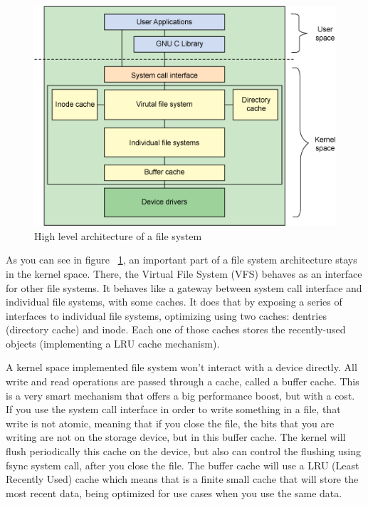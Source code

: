         \begin{figure}[h]
           \begin{center}
               \includegraphics[width=\textwidth]{theoretical/filesystem-arhitecture.png}
            \end{center}
            \caption{High level architecture of a file system \cite{FSA}}
            \label{fig:filesystem}
        \end{figure}

        As you can see in figure ~\ref{fig:filesystem}, an important part of a file system architecture stays in the kernel space. There, the Virtual File System (VFS) behaves as an interface for other file systems. It behaves like a gateway between system call interface and individual file systems, with some caches. It does that by exposing a series of interfaces to individual file systems, optimizing using two caches: dentries (directory cache) and inode. Each one of those caches stores the recently-used objects (implementing a LRU cache mechanism).

        A kernel space implemented file system won't interact with a device directly. All write and read operations are passed through a cache, called a buffer cache. This is a very smart mechanism that offers a big performance boost, but with a cost. If you use the system call interface in order to write something in a file, that write is not atomic, meaning that if you close the file, the bits that you are writing are not on the storage device, but in this buffer cache. The kernel will flush periodically this cache on the device, but also can control the flushing using fsync system call, after you close the file. The buffer cache will use a LRU (Least Recently Used) cache which means that is a finite small cache that will store the most recent data, being optimized for use cases when you use the same data.

